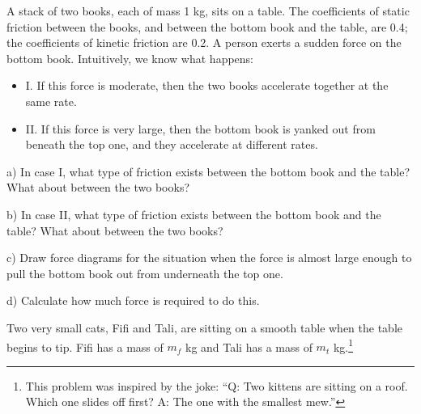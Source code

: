 \documentclass[12pt]{article}
\begin{document}
		\Large
		\centerline{}
		\normalsize
		\centerline{}
		
		




		
		A stack of two books, each of mass 1 kg, sits on a table. The coefficients of static friction between the books, and between the bottom book and the table, are 0.4; the coefficients of kinetic friction are 0.2. A person exerts a sudden force on the bottom book. Intuitively, we know what happens:
		\begin{itemize}
			\item{I. If this force is moderate, then the two books accelerate together at the same rate.}
			\item{II. If this force is very large, then the bottom book is yanked out from beneath the top one, and they accelerate at different rates.}
		\end{itemize}
		
		a) In case I, what type of friction exists between the bottom book and the table? What about between the two books?
		
		\vspace{0.7in}
		
		b) In case II, what type of friction exists between the bottom book and the table? What about between the two books?
		
		\vspace{0.7in}
		
		c) Draw force diagrams for the situation when the force is almost large enough to pull the bottom book out from underneath the top one.
		
		\vspace{1.5in}
		
		d) Calculate how much force is required to do this.
		
		\newpage
		
		
		Two very small cats, Fifi and Tali, are sitting on a smooth table when the table begins to tip. Fifi has a mass of $m_f$ kg and Tali has a mass of $m_t$ kg.\footnote{This problem was inspired by the joke: ``Q: Two kittens are sitting on a roof. Which one slides off first? A: The one with the smallest mew.''}
		
\end{document}
